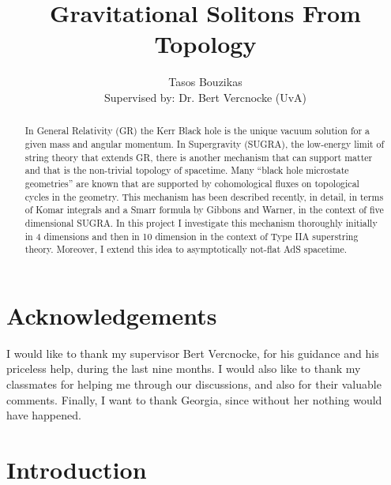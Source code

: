 \documentclass[a4paper,notitlepage]{report}
\begin{document}
\addtolength{\jot}{1em}


\title{Gravitational Solitons From Topology}
\author{Tasos Bouzikas\\
{\small Supervised by: Dr. Bert Vercnocke (UvA)}}
\date{}

\maketitle
\vspace{8em}

\begin{abstract}
\noindent In General Relativity (GR) the Kerr Black hole is the unique vacuum solution for	a given mass and angular momentum. In Supergravity (SUGRA), the low-energy limit	of string theory that extends GR, there is another mechanism that can support matter and that is the non-trivial topology of spacetime. Many ``black hole microstate geometries'' are known that are supported by cohomological fluxes on topological cycles in the geometry. This mechanism has been described recently, in detail, in terms of Komar integrals and a Smarr formula by Gibbons and Warner, in the context of five dimensional SUGRA. In this project I investigate this mechanism thoroughly initially in 4 dimensions and then in 10 dimension in the context of Type IIA superstring theory. Moreover, I extend this idea to asymptotically not-flat AdS spacetime.
\end{abstract}


\chapter*{Acknowledgements}
\begin{centering}
I would like to thank my supervisor Bert Vercnocke, for his guidance and his priceless help, during the last nine months. 
I would also like to thank my classmates for helping me through our discussions, and also for their valuable comments.
Finally, I want to thank Georgia, since without her nothing would have happened.
\end{centering}

\tableofcontents

\chapter{Introduction}
\end{document}
